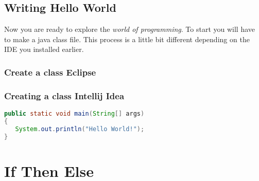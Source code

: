\documentclass{article}
\begin{document}
\subsection{Writing Hello World}
Now you are ready to explore the \emph{world of programming}. To start you will have
to make a java class file. This process is a little bit different depending on the IDE you installed earlier.

\subsubsection{Create a class Eclipse}



\subsubsection{Creating a class Intellij Idea}

\begin{lstlisting}[language=java]
public static void main(String[] args)
{
   System.out.println("Hello World!");
}
\end{lstlisting}

\section{If Then Else}
\end{document}
